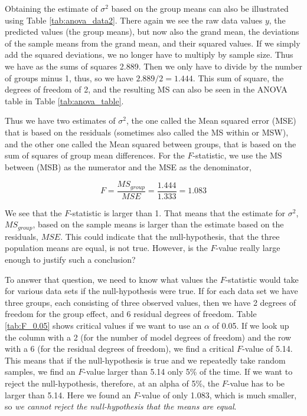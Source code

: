 \documentclass[]{book}\usepackage[]{graphicx}\usepackage[]{color}
\begin{document}
Obtaining the estimate of $\sigma^2$ based on the group means can also be illustrated using Table \ref{tab:anova_data2}. There again we see the raw data values $y$, the predicted values (the group means), but now also the grand mean, the deviations of the sample means from the grand mean, and their squared values. If we simply add the squared deviations, we no longer have to multiply by sample size. Thus we have as the sums of squares 2.889. Then we only have to divide by the number of groups minus 1, thus, so we have $2.889/2=1.444$. This sum of square, the degrees of freedom of 2, and the resulting MS can also be seen in the ANOVA table in Table \ref{tab:anova_table}.

Thus we have two estimates of $\sigma^2$, the one called the Mean squared error (MSE) that is based on the residuals (sometimes also called the MS within or MSW), and the other one called the Mean squared between groups, that is based on the sum of squares of group mean differences. For the $F$-statistic, we use the MS between (MSB) as the numerator and the MSE as the denominator,

\begin{equation}
F = \frac{MS_{group}}{MSE} = \frac{1.444}  {1.333}=
1.083
\end{equation}

We see that the $F$-statistic is larger than 1. That means that the estimate for $\sigma^2$, $MS_{group}$, based on the sample means is larger than the estimate based on the residuals, $MSE$. This could indicate that the null-hypothesis, that the three population means are equal, is not true. However, is the $F$-value really large enough to justify such a conclusion? 

To answer that question, we need to know what values the $F$-statistic would take for various data sets if the null-hypothesis were true. If for each data set we have three groups, each consisting of three observed values, then we have 2 degrees of freedom for the group effect, and 6 residual degrees of freedom. Table \ref{tab:F_0.05} shows critical values if we want to use an $\alpha$ of 0.05. If we look up the column with a 2 (for the number of model degrees of freedom) and the row with a 6 (for the residual degrees of freedom), we find a critical $F$-value of 5.14. This means that if the null-hypothesis is true and we repeatedly take random samples, we find an $F$-value larger than 5.14 only 5\% of the time. If we want to reject the null-hypothesis, therefore, at an alpha of 5\%, the $F$-value has to be larger than 5.14. Here we found an $F$-value of only 1.083, which is much smaller, so \textit{we cannot reject the null-hypothesis that the means are equal}. 
\end{document}
